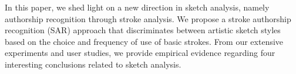 In this paper, we shed light on a new direction in sketch analysis, namely authorship recognition through stroke analysis. We propose a stroke authorship recognition (SAR) approach that discriminates between artistic sketch styles based on the choice and frequency of use of basic strokes. From our extensive experiments and user studies, we provide empirical evidence regarding four interesting conclusions related to sketch analysis.


%
%
%


